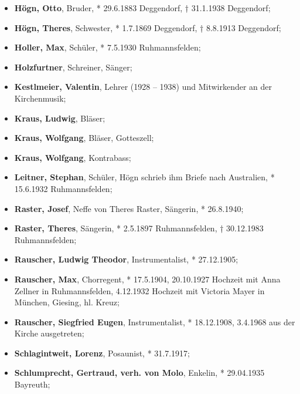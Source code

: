 \begin{itemize}
\item \textbf{Högn, Otto}, Bruder, * 29.6.1883 Deggendorf, †
31.1.1938 Deggendorf;

\item \textbf{Högn, Theres}, Schwester, * 1.7.1869 Deggendorf, †
8.8.1913 Deggendorf;

\item \textbf{Holler, Max}, Schüler, * 7.5.1930 Ruhmannsfelden;

\item \textbf{Holzfurtner}, Schreiner, Sänger;

\item \textbf{Kestlmeier, Valentin}, Lehrer (1928 – 1938) und
Mitwirkender an der Kirchenmusik;

\item \textbf{Kraus, Ludwig}, Bläser;

\item \textbf{Kraus, Wolfgang}, Bläser, Gotteszell;

\item \textbf{Kraus, Wolfgang}, Kontrabass;

\item \textbf{Leitner, Stephan}, Schüler, Högn schrieb ihm Briefe nach
Australien, * 15.6.1932 Ruhmannsfelden;

\item \textbf{Raster, Josef}, Neffe von Theres Raster, Sängerin, *
26.8.1940;

\item \textbf{Raster, Theres}, Sängerin, * 2.5.1897 Ruhmannsfelden, †
30.12.1983 Ruhmannsfelden;

\item \textbf{Rauscher, Ludwig Theodor}, Instrumentalist, * 27.12.1905;

\item \textbf{Rauscher, Max}, Chorregent, * 17.5.1904, 20.10.1927
Hochzeit mit Anna Zellner in Ruhmannsfelden, 4.12.1932 Hochzeit mit
Victoria Mayer in München, Giesing, hl. Kreuz;

\item \textbf{Rauscher, Siegfried Eugen}, Instrumentalist, * 18.12.1908,
3.4.1968 aus der Kirche ausgetreten;

\item \textbf{Schlagintweit, Lorenz}, Posaunist, * 31.7.1917;

\item \textbf{Schlumprecht, Gertraud, verh. von Molo}, Enkelin,
* 29.04.1935 Bayreuth;


\end{itemize}
